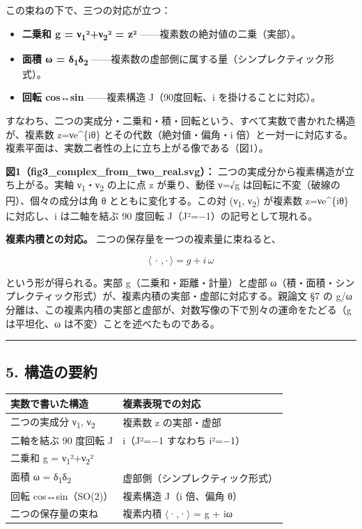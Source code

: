 \documentclass[11pt]{ltjsarticle}
\providecommand{\tightlist}{\setlength{\itemsep}{0pt}\setlength{\parskip}{0pt}}
\newcounter{none}
\begin{document}
この束ねの下で、三つの対応が立つ：

\begin{itemize}
\tightlist
\item
  \textbf{二乗和 g = ν\textsubscript{1}²+ν\textsubscript{2}² = \textbar z\textbar²}
  ------複素数の絶対値の二乗（実部）。
\item
  \textbf{面積 ω = δ\textsubscript{1}δ\textsubscript{2}}
  ------複素数の虚部側に属する量（シンプレクティック形式）。
\item
  \textbf{回転 cos↔sin} ------複素構造 J（90度回転、i
  を掛けることに対応）。
\end{itemize}

すなわち、二つの実成分・二乗和・積・回転という、すべて実数で書かれた構造が、複素数
z=νe\^{}\{iθ\} とその代数（絶対値・偏角・i
倍）と一対一に対応する。複素平面は、実数二者性の上に立ち上がる像である（図1）。

\textbf{図1（fig3\_complex\_from\_two\_real.svg）：}
二つの実成分から複素構造が立ち上がる。実軸 ν\textsubscript{1}・ν\textsubscript{2} の上に点 z
が乗り、動径 ν=√g は回転に不変（破線の円）、個々の成分は角 θ
とともに変化する。この対 (ν\textsubscript{1}, ν\textsubscript{2}) が複素数 z=νe\^{}\{iθ\} に対応し、i
は二軸を結ぶ 90 度回転 J（J²=−1）の記号として現れる。

\textbf{複素内積との対応。} 二つの保存量を一つの複素量に束ねると、

\[\langle\,\cdot\,,\cdot\,\rangle = g + i\,\omega\]

という形が得られる。実部 g（二乗和・距離・計量）と虚部
ω（積・面積・シンプレクティック形式）が、複素内積の実部・虚部に対応する。親論文
§7 の g/ω
分離は、この複素内積の実部と虚部が、対数写像の下で別々の運命をたどる（g
は平坦化、ω は不変）ことを述べたものである。

\begin{center}\rule{0.5\linewidth}{0.5pt}\end{center}

\subsection{5. 構造の要約}\label{ux69cbux9020ux306eux8981ux7d04}

{\def\LTcaptype{none} %
\begin{longtable}[]{@{}ll@{}}
\toprule\noalign{}
実数で書いた構造 & 複素表現での対応 \\
\midrule\noalign{}
\endhead
\bottomrule\noalign{}
\endlastfoot
二つの実成分 ν\textsubscript{1}, ν\textsubscript{2} & 複素数 z の実部・虚部 \\
二軸を結ぶ 90 度回転 J & i（J²=−1 すなわち i²=−1） \\
二乗和 g = ν\textsubscript{1}²+ν\textsubscript{2}² & \\
面積 ω = δ\textsubscript{1}δ\textsubscript{2} & 虚部側（シンプレクティック形式） \\
回転 cos↔sin（SO(2)） & 複素構造 J（i 倍、偏角 θ） \\
二つの保存量の束ね & 複素内積 $\langle$·,·$\rangle$ = g + iω \\
\end{longtable}
}
\end{document}
